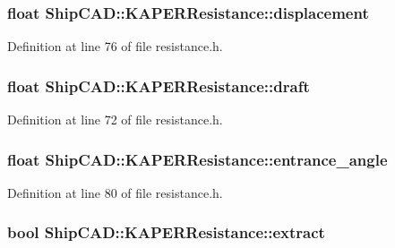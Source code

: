\hypertarget{structShipCAD_1_1KAPERResistance_a5227818b90eab4991e339bbdf2e382ca}{
\subsubsection[{displacement}]{\setlength{\rightskip}{0pt plus 5cm}float Ship\-C\-A\-D\-::\-K\-A\-P\-E\-R\-Resistance\-::displacement}}\label{structShipCAD_1_1KAPERResistance_a5227818b90eab4991e339bbdf2e382ca}


Definition at line 76 of file resistance.\-h.

\hypertarget{structShipCAD_1_1KAPERResistance_a0be8d3ba3d4e485abe71c462575b478a}{
\subsubsection[{draft}]{\setlength{\rightskip}{0pt plus 5cm}float Ship\-C\-A\-D\-::\-K\-A\-P\-E\-R\-Resistance\-::draft}}\label{structShipCAD_1_1KAPERResistance_a0be8d3ba3d4e485abe71c462575b478a}


Definition at line 72 of file resistance.\-h.

\hypertarget{structShipCAD_1_1KAPERResistance_a941bc6efce4bc30f542cae5c68218aee}{
\subsubsection[{entrance\-\_\-angle}]{\setlength{\rightskip}{0pt plus 5cm}float Ship\-C\-A\-D\-::\-K\-A\-P\-E\-R\-Resistance\-::entrance\-\_\-angle}}\label{structShipCAD_1_1KAPERResistance_a941bc6efce4bc30f542cae5c68218aee}


Definition at line 80 of file resistance.\-h.

\hypertarget{structShipCAD_1_1KAPERResistance_a61ce222b79ad3964b278f5239dd2618f}{
\subsubsection[{extract}]{\setlength{\rightskip}{0pt plus 5cm}bool Ship\-C\-A\-D\-::\-K\-A\-P\-E\-R\-Resistance\-::extract}}\label{structShipCAD_1_1KAPERResistance_a61ce222b79ad3964b278f5239dd2618f}


